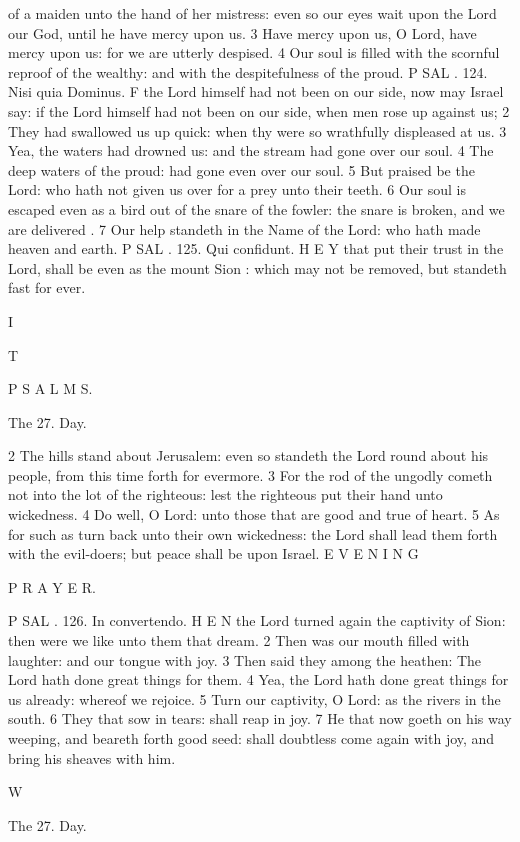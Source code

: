 of a maiden unto the hand of her mistress: even so our eyes wait upon the Lord our God, until he have mercy upon us. 3 Have mercy upon us, O Lord, have mercy upon us: for we are utterly despised. 4 Our soul is filled with the scornful reproof of the wealthy: and with the despitefulness of the proud. P SAL . 124. Nisi quia Dominus. F the Lord himself had not been on our side, now may Israel say: if the Lord himself had not been on our side, when men rose up against us; 2 They had swallowed us up quick: when thy were so wrathfully displeased at us. 3 Yea, the waters had drowned us: and the stream had gone over our soul. 4 The deep waters of the proud: had gone even over our soul. 5 But praised be the Lord: who hath not given us over for a prey unto their teeth. 6 Our soul is escaped even as a bird out of the snare of the fowler: the snare is broken, and we are delivered . 7 Our help standeth in the Name of the Lord: who hath made heaven and earth. P SAL . 125. Qui confidunt. H E Y that put their trust in the Lord, shall be even as the mount Sion : which may not be removed, but standeth fast for ever.

I

T

P S A L M S.

The 27. Day.

2 The hills stand about Jerusalem: even so standeth the Lord round about his people, from this time forth for evermore. 3 For the rod of the ungodly cometh not into the lot of the righteous: lest the righteous put their hand unto wickedness. 4 Do well, O Lord: unto those that are good and true of heart. 5 As for such as turn back unto their own wickedness: the Lord shall lead them forth with the evil-doers; but peace shall be upon Israel. E V E N I N G

P R A Y E R.

P SAL . 126. In convertendo. H E N the Lord turned again the captivity of Sion: then were we like unto them that dream. 2 Then was our mouth filled with laughter: and our tongue with joy. 3 Then said they among the heathen: The Lord hath done great things for them. 4 Yea, the Lord hath done great things for us already: whereof we rejoice. 5 Turn our captivity, O Lord: as the rivers in the south. 6 They that sow in tears: shall reap in joy. 7 He that now goeth on his way weeping, and beareth forth good seed: shall doubtless come again with joy, and bring his sheaves with him.

W

The 27. Day.

